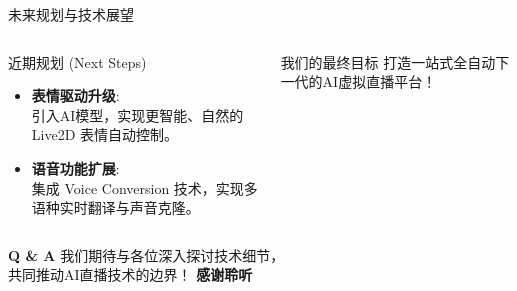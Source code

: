 \documentclass{beamer}
\begin{document}
	\begin{frame}{未来规划与技术展望}
		\begin{columns}[T]
			\begin{column}{0.5\textwidth}
				\begin{exampleblock}{近期规划 (Next Steps)}
					\begin{itemize}
						\item \textbf{表情驱动升级}: \\
						引入AI模型，实现更智能、自然的 Live2D 表情自动控制。
						\item \textbf{语音功能扩展}: \\
						集成 Voice Conversion 技术，实现多语种实时翻译与声音克隆。
					\end{itemize}
				\end{exampleblock}
			\end{column}
			\begin{column}{0.5\textwidth}
				\begin{alertblock}{我们的最终目标}
					\Large
					打造一站式全自动下一代的AI虚拟直播平台！
				\end{alertblock}
			\end{column}
		\end{columns}
	\end{frame}
	\begin{frame}
		\centering
		\Huge{\textbf{Q \& A}}
		\vspace{2em}
		\large{我们期待与各位深入探讨技术细节，\\共同推动AI直播技术的边界！}
		\vspace{2em}
		\Large{\textbf{感谢聆听}}
	\end{frame}
\end{document}
